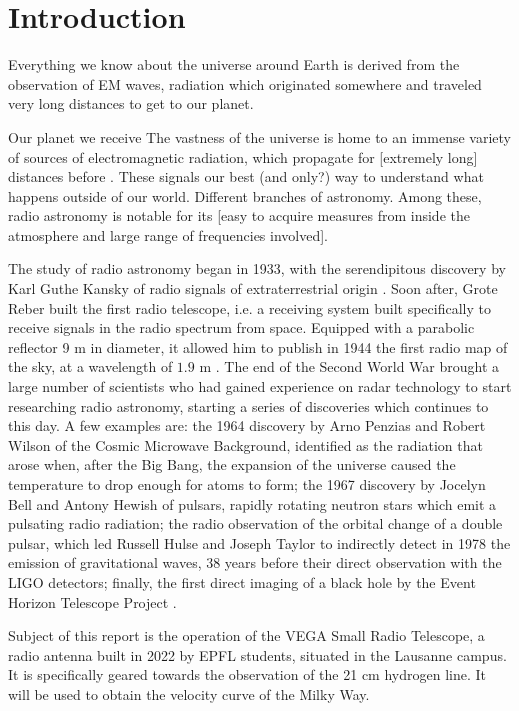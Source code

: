 \section{Introduction}
Everything we know about the universe around Earth is derived from the observation of EM waves, radiation which originated somewhere and traveled very long distances to get to our planet.

Our planet we receive
The vastness of the universe is home to an immense variety of sources of electromagnetic radiation, which propagate for [extremely long] distances before . These signals our best (and only?) way to understand what happens outside of our world.
Different branches of astronomy. Among these, radio astronomy is notable for its [easy to acquire measures from inside the atmosphere and large range of frequencies involved].

The study of radio astronomy began in 1933, with the serendipitous discovery by Karl Guthe Kansky of radio signals of extraterrestrial origin \cite{condon_essential_2016}. 
Soon after, Grote Reber built the first radio telescope, i.e. a receiving system built specifically to receive signals in the radio spectrum from space. Equipped with a parabolic reflector 9 m in diameter, it allowed him to publish in 1944 the first radio map of the sky, at a wavelength of $1.9$ m \cite{lauterbach_radio_2022}.
The end of the Second World War brought a large number of scientists who had gained experience on radar technology to start researching radio astronomy, starting a series of discoveries which continues to this day.
A few examples are: 
the 1964 discovery by Arno Penzias and Robert Wilson of the Cosmic Microwave Background, identified as the radiation that arose when, after the Big Bang, the expansion of the universe caused the temperature to drop enough for atoms to form;
the 1967 discovery by Jocelyn Bell and Antony Hewish of pulsars, rapidly rotating neutron stars which emit a pulsating radio radiation; 
the radio observation of the orbital change of a double pulsar, which led Russell Hulse and Joseph Taylor to indirectly detect in 1978 the emission of gravitational waves, 38 years before their direct observation with the LIGO detectors;
finally, the first direct imaging of a black hole by the Event Horizon Telescope Project \cite{the_event_horizon_telescope_collaboration_first_2019}.

Subject of this report is the operation of the VEGA Small Radio Telescope, a radio antenna built in 2022 by EPFL students, situated in the Lausanne campus.
It is specifically geared towards the observation of the 21 cm hydrogen line.
It will be used to obtain the velocity curve of the Milky Way.

